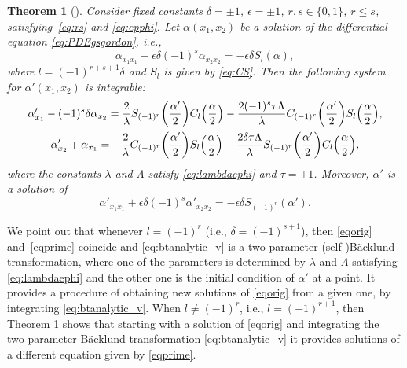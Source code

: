 \documentclass[pdftex]{sigma}
\numberwithin{equation}{section}
\newtheorem{Theorem}{Theorem}[section]
\begin{document}
\begin{Theorem}[\cite{KRT2022}]\label{thBT}
Consider fixed constants $\delta=\pm 1$, $\epsilon=\pm 1$,
$r,s\in \{0,1\}$, $r\leq s$, satisfying~\eqref{eq:rs} and \eqref{eq:epphi}.
Let $\alpha(x_1,x_2)$ be a solution of
the differential equation \eqref{eq:PDEgsgordon}, i.e.,
\begin{equation}\label{eqorig}
\alpha_{x_1x_1}+\epsilon \delta(-1)^{s} \alpha_{x_2x_2} =-\epsilon\delta S_l(\alpha),
\end{equation}
where $l=(-1)^{r+s+1}\delta$ and $S_l$ is given by \eqref{eq:CS}.
Then the following system for $\alpha'(x_1,x_2)$ is integrable:
\begin{gather}
\alpha'_{x_1}-(-1)^s\delta\alpha_{x_2}=\frac{2}{\lambda}S_{(-1)^r}\biggl(\frac{\alpha'}{2}\biggr)C_{l}\Bigl(\frac{\alpha}{2}\Bigr)-\frac{2(-1)^s\tau\Lambda}{\lambda} C_{(-1)^r}\biggl(\frac{\alpha'}{2}\biggr)S_{l}\Bigl(\frac{\alpha}{2}\Bigr),\nonumber\\
\alpha'_{x_2}+\alpha_{x_1}=-\frac{2}{\lambda}C_{(-1)^r}\biggl(\frac{\alpha'}{2}\biggr)S_{l}\Bigl(\frac{\alpha}{2}\Bigr)-\frac{2\delta\tau\Lambda}{\lambda} S_{(-1)^r}\biggl(\frac{\alpha'}{2}\biggr)C_{l}\Bigl(\frac{\alpha}{2}\Bigr),\label{eq:btanalytic_v}
\end{gather}
 where the constants $\lambda$ and $\Lambda$ satisfy \eqref{eq:lambdaephi} and $\tau=\pm 1$. Moreover, $\alpha'$ is a solution of
\begin{equation}\label{eqprime}
\alpha'_{x_1x_1}+\epsilon\delta (-1)^{s} \alpha'_{x_2x_2} =-\epsilon\delta S_{(-1)^r}(\alpha').
\end{equation}
\end{Theorem}

\begin{Remark}\label{rmk:remarkl}
We point out that
 whenever $l=(-1)^r$ \big(i.e., $\delta=(-1)^{s+1}$\big), then \eqref{eqorig} and~\eqref{eqprime} coincide and \eqref{eq:btanalytic_v} is a two parameter (self-)B\"acklund transformation, where one of the parameters is determined by $\lambda$ and $\Lambda$ satisfying \eqref{eq:lambdaephi} and the other one is the initial condition of $\alpha'$ at a point. It provides a procedure of obtaining new solutions of \eqref{eqorig} from a given one, by integrating \eqref{eq:btanalytic_v}.
 When $l\neq (-1)^r $, i.e., $l=(-1)^{r+1}$, then
Theorem \ref{thBT} shows that starting with a solution of \eqref{eqorig} and integrating the two-parameter B\"acklund transformation \eqref{eq:btanalytic_v} it provides solutions of a different equation given by \eqref{eqprime}.
 \end{Remark}
\end{document}
